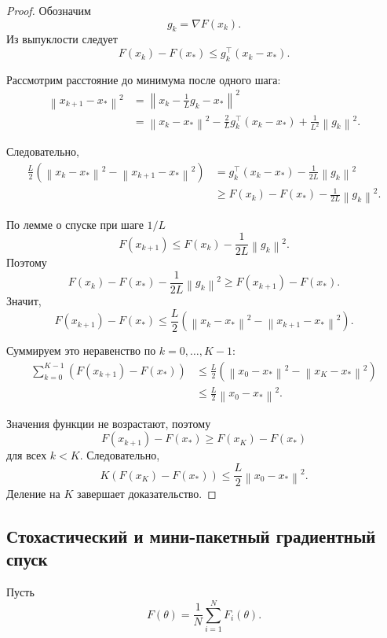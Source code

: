 \documentclass[12pt,a4paper]{article}
\theoremstyle{plain}
\theoremstyle{definition}
\theoremstyle{remark}
\newcommand{\norm}[1]{\left\lVert #1 \right\rVert}
\begin{document}
\begin{proof}
Обозначим
\[
    g_k=\nabla F(x_k).
\]
Из выпуклости следует
\[
    F(x_k)-F(x_*)
    \leq
    g_k^\top(x_k-x_*).
\]

Рассмотрим расстояние до минимума после одного шага:
\[
\begin{aligned}
    \norm{x_{k+1}-x_*}^2
    &=
    \norm{
        x_k-\frac{1}{L}g_k-x_*
    }^2\\
    &=
    \norm{x_k-x_*}^2
    -
    \frac{2}{L}
    g_k^\top(x_k-x_*)
    +
    \frac{1}{L^2}\norm{g_k}^2.
\end{aligned}
\]

Следовательно,
\[
\begin{aligned}
    \frac{L}{2}
    \left(
        \norm{x_k-x_*}^2
        -
        \norm{x_{k+1}-x_*}^2
    \right)
    &=
    g_k^\top(x_k-x_*)
    -
    \frac{1}{2L}\norm{g_k}^2\\
    &\geq
    F(x_k)-F(x_*)
    -
    \frac{1}{2L}\norm{g_k}^2.
\end{aligned}
\]

По лемме о спуске при шаге $1/L$
\[
    F(x_{k+1})
    \leq
    F(x_k)-\frac{1}{2L}\norm{g_k}^2.
\]
Поэтому
\[
    F(x_k)-F(x_*)
    -
    \frac{1}{2L}\norm{g_k}^2
    \geq
    F(x_{k+1})-F(x_*).
\]
Значит,
\[
    F(x_{k+1})-F(x_*)
    \leq
    \frac{L}{2}
    \left(
        \norm{x_k-x_*}^2
        -
        \norm{x_{k+1}-x_*}^2
    \right).
\]

Суммируем это неравенство по $k=0,\ldots,K-1$:
\[
\begin{aligned}
    \sum_{k=0}^{K-1}
    \left(
        F(x_{k+1})-F(x_*)
    \right)
    &\leq
    \frac{L}{2}
    \left(
        \norm{x_0-x_*}^2
        -
        \norm{x_K-x_*}^2
    \right)\\
    &\leq
    \frac{L}{2}\norm{x_0-x_*}^2.
\end{aligned}
\]

Значения функции не возрастают, поэтому
\[
    F(x_{k+1})-F(x_*)
    \geq
    F(x_K)-F(x_*)
\]
для всех $k<K$. Следовательно,
\[
    K\left(F(x_K)-F(x_*)\right)
    \leq
    \frac{L}{2}\norm{x_0-x_*}^2.
\]
Деление на $K$ завершает доказательство.
\end{proof}

\subsection{Стохастический и мини-пакетный градиентный спуск}

Пусть
\[
    F(\theta)
    =
    \frac{1}{N}
    \sum_{i=1}^{N}F_i(\theta).
\]
\end{document}
